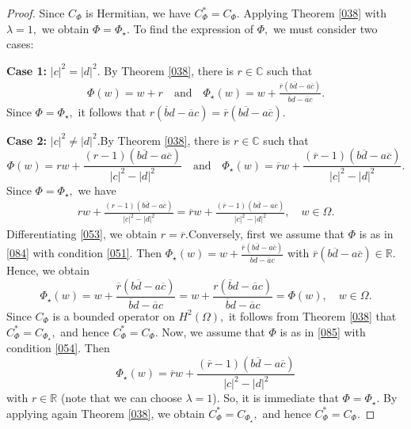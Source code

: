 \documentclass[11pt]{amsart}%
\theoremstyle{definition}
\theoremstyle{remark}
\numberwithin{equation}{section}
\begin{document}
\begin{proof}
Since $C_{\Phi}$ is Hermitian, we have $C_{\Phi}^{*}=C_{\Phi}.$
Applying Theorem \ref{038} with $\lambda=1,$ we obtain $\Phi=\Phi_{\star}.$ To
find the expression of $\Phi,$ we must consider two cases:

\textbf{Case 1:} $|c|^{2}=|d|^{2}.$ \newline By Theorem \ref{038}, there is
$r\in\mathbb{C}$ such that
\begin{align*}
\Phi(w)=w+r \quad\text{and} \quad\Phi_{\star}(w)= w+\frac{\overline
{r}(b\overline{d}-a\overline{c})}{\overline{b}d-\overline{a}c}.
\end{align*}
Since $\Phi=\Phi_{\star},$ it follows that $r(\overline{b}d-\overline
{a}c)=\overline{r}(b\overline{d}-a\overline{c}).$

\textbf{Case 2:} $|c|^{2}\neq|d|^{2}.$\newline By Theorem \ref{038}, there is
$r\in\mathbb{C}$ such that
\[
\Phi(w)=rw+\frac{(r-1)(b\overline{d}-a\overline{c})}{|c|^{2}-|d|^{2}}%
\quad\text{and}\quad\Phi_{\star}(w)=\overline{r}w+\frac{(\overline
{r}-1)(b\overline{d}-a\overline{c})}{|c|^{2}-|d|^{2}}.
\]
Since $\Phi=\Phi_{\star},$ we have
\begin{align}
\label{053}rw+\frac{(r-1)(b\overline{d}-a\overline{c})}{|c|^{2}-|d|^{2}%
}=\overline{r}w+\frac{(\overline{r}-1)(b\overline{d}-a\overline{c})}%
{|c|^{2}-|d|^{2}},\quad w\in\Omega.
\end{align}
Differentiating \eqref{053}, we obtain $r=\overline{r}.$\newline Conversely,
first we assume that $\Phi$ is as in \eqref{084} with condition \eqref{051}.
Then $\Phi_{\star}(w)=w+\frac{\overline{r}(b\overline{d}-a\overline{c}%
)}{\overline{b}d-\overline{a}c}$ with $\overline{r}(b\overline{d}%
-a\overline{c})\in\mathbb{R}.$ Hence, we obtain
\[
\Phi_{\star}(w)=w+\frac{\overline{r}(b\overline{d}-a\overline{c})}%
{\overline{b}d-\overline{a}c}=w+\frac{r(\overline{b}d-\overline{a}%
c)}{\overline{b}d-\overline{a}c}=\Phi(w),\quad w\in\Omega.
\]
Since $C_{\Phi}$ is a bounded operator on 
$H^{2}(\Omega),$ it follows from Theorem \ref{038} that $C_{\Phi}^{\ast}=C_{\Phi_{\star
}},$ and hence $C_{\Phi}^{\ast}=C_{\Phi}.$ Now, we assume that $\Phi$ is as in
\eqref{085} with condition \eqref{054}. Then
\[
\Phi_{\star}(w)=\overline{r}w+\frac{(\overline{r}-1)(b\overline{d}%
-a\overline{c})}{|c|^{2}-|d|^{2}}%
\]
with $r\in\mathbb{R}$ (note that we can choose $\lambda=1$). So, it is
immediate that $\Phi=\Phi_{\star}.$ By applying again Theorem \ref{038}, we
obtain $C_{\Phi}^{\ast}=C_{\Phi_{\star}},$ and hence $C_{\Phi}^{\ast}=C_{\Phi
}.$
\end{proof}
\end{document}
